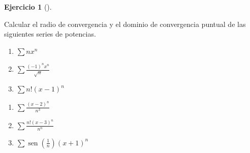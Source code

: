 \documentclass[
  a4paper,
]{scrreport}
\theoremstyle{definition}
\newtheorem{exercise}{Ejercicio}[chapter]
\theoremstyle{remark}
\begin{document}
\begin{exercise}[]\protect\hypertarget{exr-radio-convergencia}{}\label{exr-radio-convergencia}

Calcular el radio de convergencia y el dominio de convergencia puntual
de las siguientes series de potencias.

\begin{enumerate}
\def\labelenumi{\alph{enumi}.}
\item
  \(\sum nx^n\)
\item
  \(\sum \frac{(-1)^nx^n}{\sqrt{n}}\)
\item
  \(\sum n!(x-1)^n\)
\end{enumerate}

\begin{enumerate}
\def\labelenumi{\alph{enumi}.}
\setcounter{enumi}{3}
\item
  \(\sum \frac{(x-2)^n}{n^3}\)
\item
  \(\sum \frac{n!(x-3)^n}{n^n}\)
\item
  \(\sum \operatorname{sen}\left(\frac{1}{n}\right) (x+1)^n\)
\end{enumerate}

\end{exercise}
\end{document}
